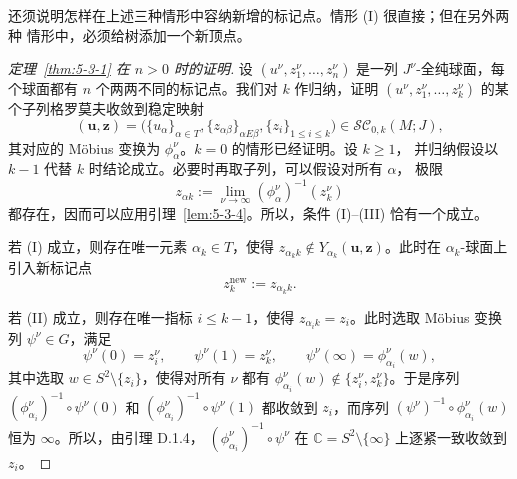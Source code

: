 还须说明怎样在上述三种情形中容纳新增的标记点。情形 (I) 很直接；但在另外两种
情形中，必须给树添加一个新顶点。

\begin{proof}[定理~\ref{thm:5-3-1} 在 $n>0$ 时的证明]
设 $(u^\nu,z_1^\nu,\ldots,z_n^\nu)$ 是一列 $J^\nu$-全纯球面，每个球面都有
$n$ 个两两不同的标记点。我们对 $k$ 作归纳，证明
$(u^\nu,z_1^\nu,\ldots,z_k^\nu)$ 的某个子列格罗莫夫收敛到稳定映射
\[
  (\mathbf u,\mathbf z)
  =\bigl(\{u_\alpha\}_{\alpha\in T},
    \{z_{\alpha\beta}\}_{\alpha E\beta},
    \{z_i\}_{1\le i\le k}\bigr)
  \in\mathcal{SC}_{0,k}(M;J),
\]
其对应的 Möbius 变换为 $\phi_\alpha^\nu$。$k=0$ 的情形已经证明。设 $k\ge1$，
并归纳假设以 $k-1$ 代替 $k$ 时结论成立。必要时再取子列，可以假设对所有 $\alpha$，
极限
\begin{equation}\label{eq:5-3-7}
  z_{\alpha k}:=\lim_{\nu\to\infty}(\phi_\alpha^\nu)^{-1}(z_k^\nu)
\end{equation}
都存在，因而可以应用引理~\ref{lem:5-3-4}。所以，条件 (I)--(III) 恰有一个成立。

若 (I) 成立，则存在唯一元素 $\alpha_k\in T$，使得
$z_{\alpha_k k}\notin Y_{\alpha_k}(\mathbf u,\mathbf z)$。此时在
$\alpha_k$-球面上引入新标记点
\[
  z_k^{\mathrm{new}}:=z_{\alpha_k k}.
\]

若 (II) 成立，则存在唯一指标 $i\le k-1$，使得 $z_{\alpha_i k}=z_i$。此时选取
Möbius 变换列 $\psi^\nu\in G$，满足
\[
  \psi^\nu(0)=z_i^\nu,
  \qquad
  \psi^\nu(1)=z_k^\nu,
  \qquad
  \psi^\nu(\infty)=\phi_{\alpha_i}^\nu(w),
\]
其中选取 $w\in S^2\setminus\{z_i\}$，使得对所有 $\nu$ 都有
$\phi_{\alpha_i}^\nu(w)\notin\{z_i^\nu,z_k^\nu\}$。于是序列
$(\phi_{\alpha_i}^\nu)^{-1}\circ\psi^\nu(0)$ 和
$(\phi_{\alpha_i}^\nu)^{-1}\circ\psi^\nu(1)$ 都收敛到 $z_i$，而序列
$(\psi^\nu)^{-1}\circ\phi_{\alpha_i}^\nu(w)$ 恒为 $\infty$。所以，由引理 D.1.4，
$(\phi_{\alpha_i}^\nu)^{-1}\circ\psi^\nu$ 在
$\mathbb C=S^2\setminus\{\infty\}$ 上逐紧一致收敛到 $z_i$。


\end{proof}
